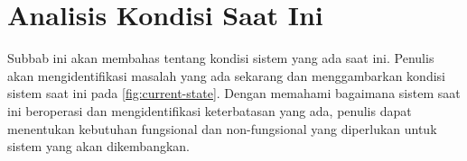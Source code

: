 \section{Analisis Kondisi Saat Ini}
\label{sec:analisis-kondisi-saat-ini}

Subbab ini akan membahas tentang kondisi sistem yang ada saat ini. Penulis akan mengidentifikasi masalah yang ada sekarang dan menggambarkan kondisi sistem saat ini pada \autoref{fig:current-state}. Dengan memahami bagaimana sistem saat ini beroperasi dan mengidentifikasi keterbatasan yang ada, penulis dapat menentukan kebutuhan fungsional dan non-fungsional yang diperlukan untuk sistem yang akan dikembangkan.


